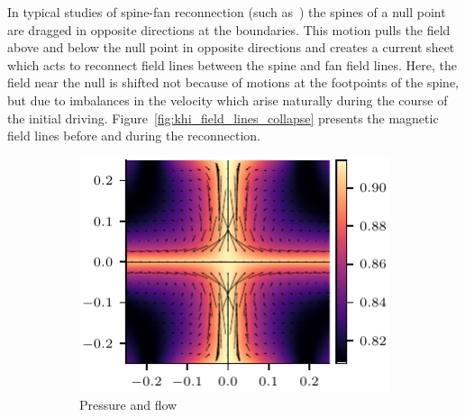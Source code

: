 In typical studies of spine-fan reconnection (such as~\cite{pontinCurrentSheetFormation2007}) the spines of a null point are dragged in opposite directions at the boundaries. This motion pulls the field above and below the null point in opposite directions and creates a current sheet which acts to reconnect field lines between the spine and fan field lines. Here, the field near the null is shifted not because of motions at the footpoints of the spine, but due to imbalances in the velocity which arise naturally during the course of the initial driving. Figure~\ref{fig:khi_field_lines_collapse} presents the magnetic field lines before and during the reconnection.

\begin{figure}[t]
  \centering
    \begin{subfigure}{0.49\textwidth}
      \includegraphics[width=\linewidth]{v-4r-4-pressure-flow-30.pdf}
      \caption{Pressure and flow}
      \label{fig:v-4r-4-pressure-flow-30}
    \end{subfigure}
    \hfill
    \begin{subfigure}{0.32\textwidth}

\end{subfigure}
\end{figure}
